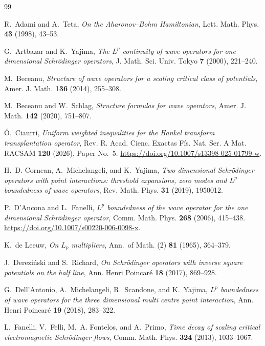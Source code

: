 \documentclass[11pt,a4paper,reqno,backref=page]{amsart}
\numberwithin{equation}{section}
\theoremstyle{definition}
\theoremstyle{remark}
\begin{document}
\begingroup
\raggedbottom
\begin{thebibliography}{99}

 R.~Adami and A.~Teta, \emph{On the
Aharonov--Bohm Hamiltonian}, Lett. Math. Phys. \textbf{43}
(1998), 43--53.

 G.~Artbazar and K.~Yajima,
\emph{The $L^p$ continuity of wave operators for one
dimensional Schr\"odinger operators}, J. Math. Sci. Univ.
Tokyo \textbf{7} (2000), 221--240.

 M.~Beceanu, \emph{Structure of wave
operators for a scaling critical class of potentials}, Amer. J.
Math. \textbf{136} (2014), 255--308.

 M.~Beceanu and W.~Schlag,
\emph{Structure formulas for wave operators}, Amer. J. Math.
\textbf{142} (2020), 751--807.

 \'O.~Ciaurri, \emph{Uniform weighted
inequalities for the Hankel transform transplantation operator},
Rev. R. Acad. Cienc. Exactas F\'is. Nat. Ser. A Mat. RACSAM
\textbf{120} (2026), Paper No.~5.
\url{https://doi.org/10.1007/s13398-025-01799-w}.

 H.~D. Cornean, A.~Michelangeli, and K.~Yajima,
\emph{Two dimensional Schr\"odinger operators with point
interactions: threshold expansions, zero modes and $L^p$
boundedness of wave operators}, Rev. Math. Phys. \textbf{31}
(2019), 1950012.

 P.~D'Ancona and L.~Fanelli,
\emph{$L^p$ boundedness of the wave operator for the one
dimensional Schr\"odinger operator}, Comm. Math. Phys.
\textbf{268} (2006), 415--438.
\url{https://doi.org/10.1007/s00220-006-0098-x}.

 K.~de Leeuw, \emph{On $L_p$ multipliers},
Ann.\ of Math. (2) \textbf{81} (1965), 364--379.

 J.~Derezi\'nski and S.~Richard,
\emph{On Schr\"odinger operators with inverse square potentials
on the half line}, Ann. Henri Poincar\'e \textbf{18} (2017),
869--928.

 G.~Dell'Antonio, A.~Michelangeli,
R.~Scandone, and K.~Yajima, \emph{$L^p$ boundedness of wave
operators for the three dimensional multi centre point
interaction}, Ann. Henri Poincar\'e \textbf{19} (2018),
283--322.

 L.~Fanelli, V.~Felli, M.~A. Fontelos, and
A.~Primo, \emph{Time decay of scaling critical electromagnetic
Schr\"odinger flows}, Comm. Math. Phys. \textbf{324} (2013),
1033--1067.


\end{thebibliography}
\end{document}
